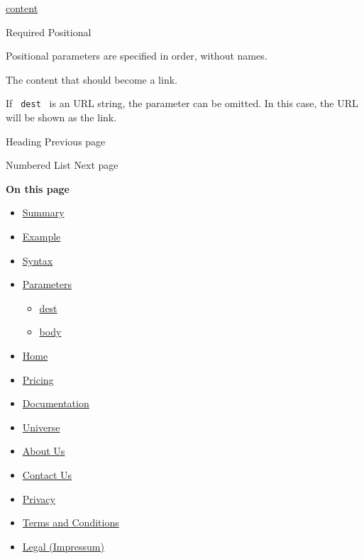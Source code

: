 \href{/docs/reference/foundations/content/}{content}

{Required} {{ Positional }}

\label{parameters-body-positional-tooltip}
Positional parameters are specified in order, without names.

The content that should become a link.

If \texttt{\ dest\ } is an URL string, the parameter can be omitted. In
this case, the URL will be shown as the link.

\href{/docs/reference/model/heading/}{\pandocbounded{}}

{ Heading } { Previous page }

\href{/docs/reference/model/enum/}{\pandocbounded{}}

{ Numbered List } { Next page }

\textbf{On this page}

\begin{itemize}
\tightlist
\item
  \hyperref[summary]{Summary}
\item
  \hyperref[example]{Example}
\item
  \hyperref[syntax]{Syntax}
\item
  \hyperref[parameters]{Parameters}

  \begin{itemize}
  \tightlist
  \item
    \hyperref[parameters-dest]{dest}
  \item
    \hyperref[parameters-body]{body}
  \end{itemize}
\end{itemize}

\begin{itemize}
\tightlist
\item
  \href{/}{Home}
\item
  \href{/pricing/}{Pricing}
\item
  \href{/docs/}{Documentation}
\item
  \href{/universe/}{Universe}
\item
  \href{/about/}{About Us}
\item
  \href{/contact/}{Contact Us}
\item
  \href{/privacy/}{Privacy}
\item
  \href{https://typst.app/terms}{Terms and Conditions}
\item
  \href{/legal/}{Legal (Impressum)}
\end{itemize}

